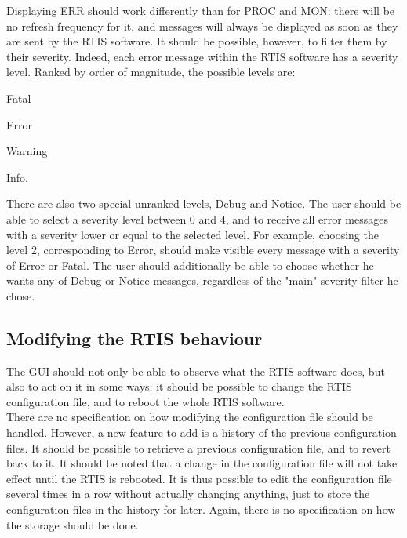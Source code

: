 \documentclass{themeensg}
\begin{document}
Displaying ERR should work differently than for PROC and MON: there will be no refresh frequency for it, and messages will always be displayed as soon as they are sent by the RTIS software. It should be possible, however, to filter them by their severity. Indeed, each error message within the RTIS software has a severity level. Ranked by order of magnitude, the possible levels are: \begin{enumerate*}
  \item Fatal
  \item Error
  \item Warning
  \item Info.
\end{enumerate*}
There are also two special unranked levels, Debug and Notice. The user should be able to select a severity level between 0 and 4, and to receive all error messages with a severity lower or equal to the selected level. For example, choosing the level 2, corresponding to Error, should make visible every message with a severity of Error or Fatal. The user should additionally be able to choose whether he wants any of Debug or Notice messages, regardless of the "main" severity filter he chose.

\subsection{Modifying the RTIS behaviour}

The GUI should not only be able to observe what the RTIS software does, but also to act on it in some ways: it should be possible to change the RTIS configuration file, and to reboot the whole RTIS software.\\

There are no specification on how modifying the configuration file should be handled. However, a new feature to add is a history of the previous configuration files. It should be possible to retrieve a previous configuration file, and to revert back to it. It should be noted that a change in the configuration file will not take effect until the RTIS is rebooted. It is thus possible to edit the configuration file several times in a row without actually changing anything, just to store the configuration files in the history for later. Again, there is no specification on how the storage should be done.
\end{document}
